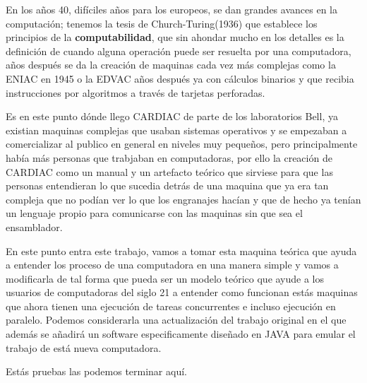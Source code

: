 \documentclass[12pt]{article}
\begin{document}
	
	En los años 40, difíciles años para los
	europeos, se dan grandes avances en la computación; tenemos la tesis de Church-Turing(1936) que establece los principios de la \textbf{computabilidad}, que
	sin ahondar mucho en los detalles es la definición de cuando alguna operación puede ser resuelta por una computadora, años después se da la creación
	de maquinas cada vez más complejas como la ENIAC en 1945 o la EDVAC años después ya con cálculos binarios y que recibia instrucciones por algoritmos
	a través de tarjetas perforadas.
	
	
	Es en este punto dónde llego CARDIAC de parte de los laboratorios Bell, ya existian maquinas complejas que usaban sistemas operativos y se empezaban
	a comercializar al publico en general en niveles muy pequeños, pero principalmente había más personas que trabjaban en computadoras, por ello la creación
	de CARDIAC como un manual y un artefacto teórico que sirviese para que las personas entendieran lo que sucedia detrás de una maquina que ya era tan compleja
	que no podían ver lo que los engranajes hacían y que de hecho ya tenían un lenguaje propio para comunicarse con las maquinas sin que sea el ensamblador.
	
	En este punto entra este trabajo, vamos a tomar esta maquina teórica que ayuda a entender los proceso de una computadora en una manera simple y vamos
	a modificarla de tal forma que pueda ser un modelo teórico que ayude a los usuarios de computadoras del siglo 21 a entender como funcionan estás maquinas
	que ahora tienen una ejecución de tareas concurrentes e incluso ejecución en paralelo. Podemos considerarla una actualización del trabajo original en el que
	además se añadirá un software especificamente diseñado en JAVA para emular el trabajo de está nueva computadora.
	
	
	Estás pruebas las podemos terminar aquí.
	
\end{document}
